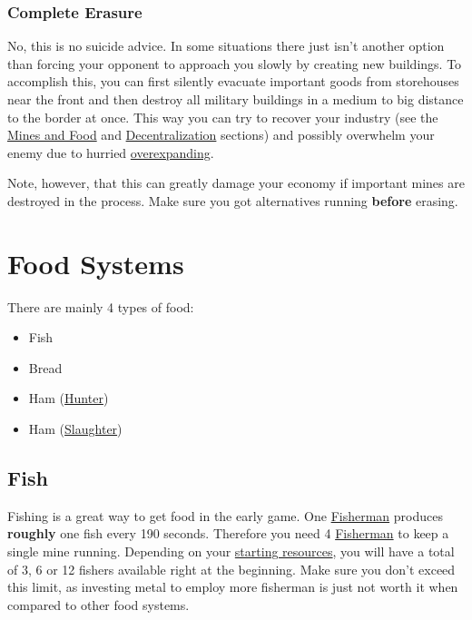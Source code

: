 \documentclass[12pt]{article}
\begin{document}
\subsubsection{Complete Erasure}
\label{sec:completeerasure}

No, this is no suicide advice. In some situations there just isn't another option than forcing your opponent to approach you slowly by creating new buildings. To accomplish this, you can first silently evacuate important goods from storehouses near the front and then destroy all military buildings in a medium to big distance to the border at once. This way you can try to recover your industry (see the \hyperref[sec:minesandfoot]{Mines and Food} and \hyperref[sec:decentralization]{Decentralization} sections) and possibly overwhelm your enemy due to hurried \hyperref[sec:overexpansion]{overexpanding}.

Note, however, that this can greatly damage your economy if important mines are destroyed in the process. Make sure you got alternatives running \textbf{before} erasing.

\section{Food Systems}
\label{sec:foodsystems}

There are mainly 4 types of food:

\begin{itemize}
  \item Fish
  \item Bread
  \item Ham (\hyperref[sec:hunter]{Hunter})
  \item Ham (\hyperref[sec:slaughterhouse]{Slaughter})
\end{itemize}

\subsection{Fish}
\label{sec:fish}

Fishing is a great way to get food in the early game. One \hyperref[sec:fisherman]{Fisherman} produces \textbf{roughly} one fish every 190 seconds. Therefore you need 4 \hyperref[sec:fisherman]{Fisherman} to keep a single mine running. Depending on your \hyperref[sec:startresources]{starting resources}, you will have a total of 3, 6 or 12 fishers available right at the beginning. Make sure you don't exceed this limit, as investing metal to employ more fisherman is just not worth it when compared to other food systems.
\end{document}
